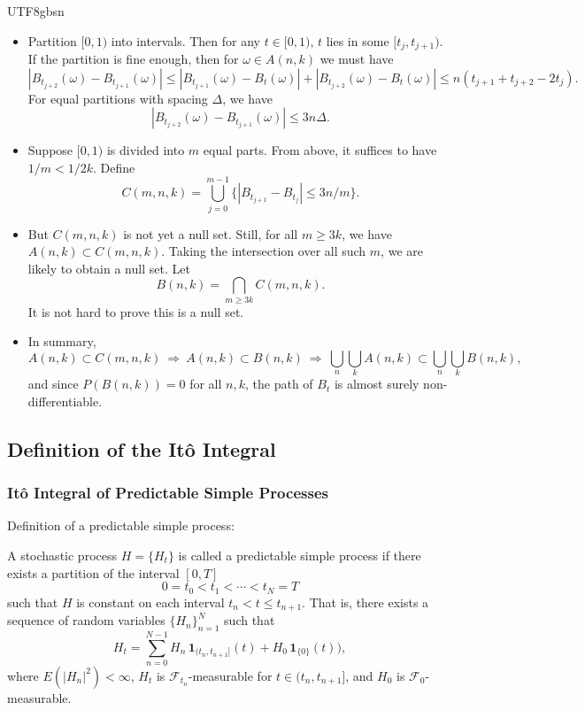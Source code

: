 \documentclass{article}
\begin{document}
\begin{CJK*}{UTF8}{gbsn}
\begin{itemize}
    \item Partition $[0,1)$ into intervals. Then for any $t\in[0,1)$, $t$ lies in some $[t_j,t_{j+1})$. If the partition is fine enough, then for $\omega\in A(n,k)$ we must have
    $$
    |B_{t_{j+2}}(\omega)-B_{t_{j+1}}(\omega)|\le |B_{t_{j+1}}(\omega)-B_t(\omega)|+|B_{t_{j+2}}(\omega)-B_t(\omega)|\le n(t_{j+1}+t_{j+2}-2t_j).
    $$
    For equal partitions with spacing $\Delta$, we have
    $$
    |B_{t_{j+2}}(\omega)-B_{t_{j+1}}(\omega)|\le 3n\Delta.
    $$
    \item Suppose $[0,1)$ is divided into $m$ equal parts. From above, it suffices to have $1/m < 1/2k$. Define
    $$
    C(m,n,k)=\bigcup_{j=0}^{m-1}\{|B_{t_{j+1}}-B_{t_j}|\le 3n/m\}.
    $$
    \item But $C(m,n,k)$ is not yet a null set. Still, for all $m\ge3k$, we have $A(n,k)\subset C(m,n,k)$. Taking the intersection over all such $m$, we are likely to obtain a null set. Let
    $$
    B(n,k)=\bigcap_{m\ge3k}C(m,n,k).
    $$
    It is not hard to prove this is a null set.
    \item In summary,
    $$
    A(n,k)\subset C(m,n,k)\ \Rightarrow\ A(n,k)\subset B(n,k)\ \Rightarrow\ \bigcup_n\bigcup_k A(n,k)\subset \bigcup_n\bigcup_k B(n,k),
    $$
    and since $P(B(n,k))=0$ for all $n,k$, the path of $B_t$ is almost surely non-differentiable.
\end{itemize}

\subsection{Definition of the Itô Integral}
\subsubsection{Itô Integral of Predictable Simple Processes}
Definition of a predictable simple process:
\begin{definition}
A stochastic process $H=\{H_t\}$ is called a predictable simple process if there exists a partition of the interval $[0,T]$
    $$0=t_0<t_1<\cdots<t_N=T$$
such that $H$ is constant on each interval $t_n< t\le t_{n+1}$. That is, there exists a sequence of random variables $\{H_n\}_{n=1}^N$ such that
    $$
    H_t=\sum_{n=0}^{N-1}H_n\,\mathbf{1}_{(t_n,t_{n+1}]}(t)+H_0\,\mathbf{1}_{\{0\}}(t)),
    $$
where $E(|H_n|^2)<\infty$, $H_t$ is $\mathcal{F}_{t_n}$-measurable for $t\in(t_n,t_{n+1}]$, and $H_0$ is $\mathcal{F}_0$-measurable.
\end{definition}


\end{CJK*}
\end{document}
